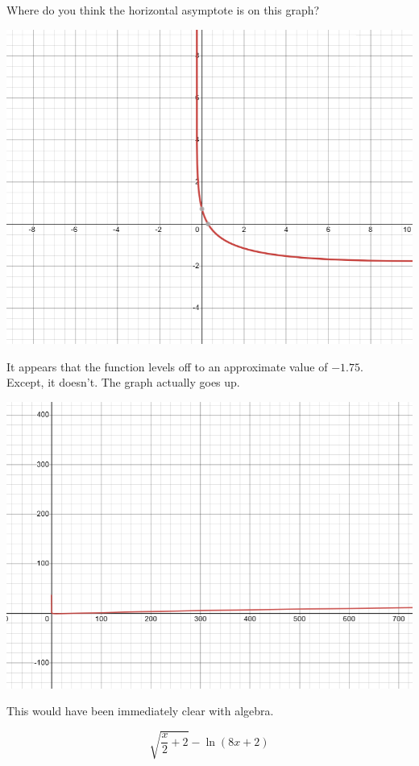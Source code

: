 \documentclass{ximera}
\begin{document}
\begin{example}


Where do you think the horizontal asymptote is on this graph?

\begin{image}
\includegraphics{pics/graph_1A.png}
\end{image}

It appears that the function levels off to an approximate value of $-1.75$. \\


Except, it doesn't. The graph actually goes up.

\begin{image}
\includegraphics{pics/graph_1B.png}
\end{image}

This would have been immediately clear with algebra.

\[  \sqrt{\frac{x}{2}+2} - \ln(8x+2)      \]


\end{example}
\end{document}
